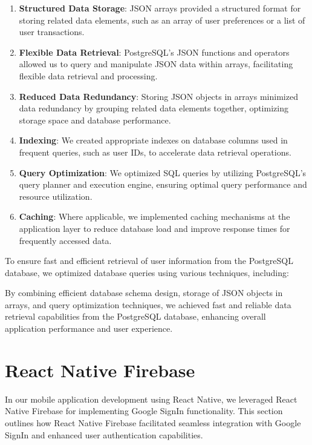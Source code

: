 \begin{enumerate}
  \item \textbf{Structured Data Storage}: JSON arrays provided a structured format for storing related data elements, such as an array of user preferences or a list of user transactions.
  
  \item \textbf{Flexible Data Retrieval}: PostgreSQL's JSON functions and operators allowed us to query and manipulate JSON data within arrays, facilitating flexible data retrieval and processing.
  
  \item \textbf{Reduced Data Redundancy}: Storing JSON objects in arrays minimized data redundancy by grouping related data elements together, optimizing storage space and database performance.
  
  \item \textbf{Indexing}: We created appropriate indexes on database columns used in frequent queries, such as user IDs, to accelerate data retrieval operations.
  
  \item \textbf{Query Optimization}: We optimized SQL queries by utilizing PostgreSQL's query planner and execution engine, ensuring optimal query performance and resource utilization.
  
  \item \textbf{Caching}: Where applicable, we implemented caching mechanisms at the application layer to reduce database load and improve response times for frequently accessed data.
\end{enumerate}

To ensure fast and efficient retrieval of user information from the PostgreSQL database, we optimized database queries using various techniques, including:


By combining efficient database schema design, storage of JSON objects in arrays, and query optimization techniques, we achieved fast and reliable data retrieval capabilities from the PostgreSQL database, enhancing overall application performance and user experience.



\section{React Native Firebase}

In our mobile application development using React Native, we leveraged React Native Firebase for implementing Google SignIn functionality. This section outlines how React Native Firebase facilitated seamless integration with Google SignIn and enhanced user authentication capabilities.

